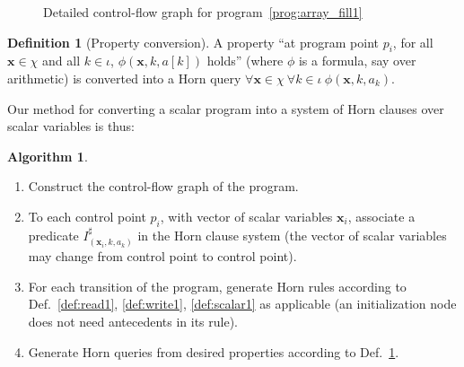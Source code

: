 \documentclass[a4paper]{article}
\newcommand{\ve}[1]{\mathbf{#1}}
\newcommand{\vx}{\ve{x}}
\newcommand{\abstr}[1]{#1^\sharp}
\theoremstyle{definition}
\newtheorem{definition}{Definition}
\newtheorem{algo}{Algorithm}
\theoremstyle{plain}
\begin{document}
\begin{figure}
\begin{center}
\end{center}
\caption{Detailed control-flow graph for program~\ref{prog:array_fill1}}
\label{fig:array_fill1_detailed_cfg}
\end{figure}

\begin{definition}[Property conversion]\label{def:property1}
A property ``at program point $p_i$, for all $\vx \in \chi$ and all $k \in \iota$, $\phi(\vx,k,a[k])$ holds'' (where $\phi$ is a formula, say over arithmetic) is converted into a Horn query $\forall \vx \in \chi~ \forall k \in \iota~ \phi(\vx,k,a_k)$.
\end{definition}

Our method for converting a scalar program into a system of Horn clauses over scalar variables is thus:
\begin{algo}\label{algo:construct_Horn}
\begin{enumerate}
\item Construct the control-flow graph of the program.
\item To each control point $p_i$, with vector of scalar variables $\vx_i$, associate a predicate $\abstr{I}_(\vx_i, k, a_k)$ in the Horn clause system (the vector of scalar variables may change from control point to control point).
\item For each transition of the program, generate Horn rules according to Def.~\ref{def:read1}, \ref{def:write1}, \ref{def:scalar1} as applicable (an initialization node does not need antecedents in its rule).
\item Generate Horn queries from desired properties according to Def.~\ref{def:property1}.
\end{enumerate}
\end{algo}
\end{document}
